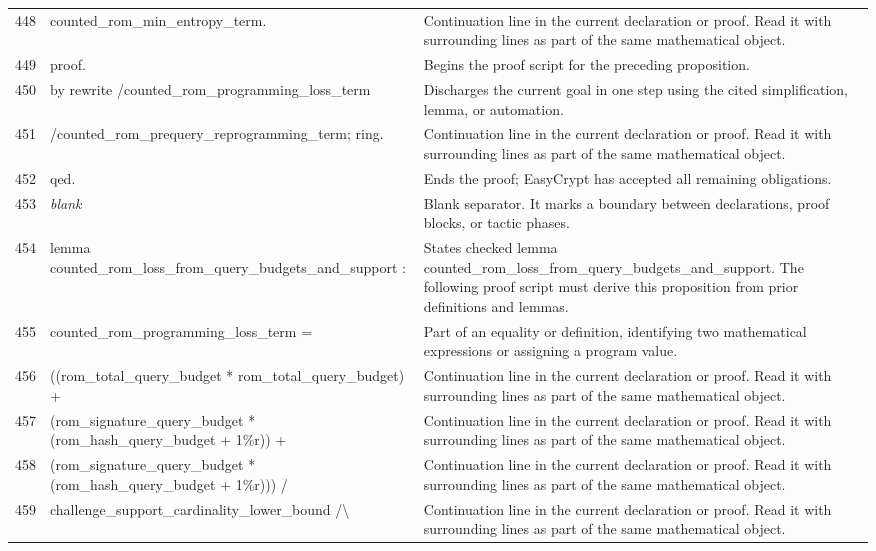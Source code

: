 \documentclass[10pt]{article}
\begin{document}
\begin{longtable}{r L{0.53\textwidth} L{0.37\textwidth}}
448 & {\ttfamily\scriptsize     counted\_rom\_min\_entropy\_term.} & Continuation line in the current declaration or proof.  Read it with surrounding lines as part of the same mathematical object. \\
449 & {\ttfamily\scriptsize proof.} & Begins the proof script for the preceding proposition. \\
450 & {\ttfamily\scriptsize by rewrite /counted\_rom\_programming\_loss\_term} & Discharges the current goal in one step using the cited simplification, lemma, or automation. \\
451 & {\ttfamily\scriptsize            /counted\_rom\_prequery\_reprogramming\_term; ring.} & Continuation line in the current declaration or proof.  Read it with surrounding lines as part of the same mathematical object. \\
452 & {\ttfamily\scriptsize qed.} & Ends the proof; EasyCrypt has accepted all remaining obligations. \\
453 & {\ttfamily\scriptsize \emph{blank}} & Blank separator.  It marks a boundary between declarations, proof blocks, or tactic phases. \\
454 & {\ttfamily\scriptsize lemma counted\_rom\_loss\_from\_query\_budgets\_and\_support :} & States checked lemma counted\_rom\_loss\_from\_query\_budgets\_and\_support.  The following proof script must derive this proposition from prior definitions and lemmas. \\
455 & {\ttfamily\scriptsize   counted\_rom\_programming\_loss\_term =} & Part of an equality or definition, identifying two mathematical expressions or assigning a program value. \\
456 & {\ttfamily\scriptsize     ((rom\_total\_query\_budget * rom\_total\_query\_budget) +} & Continuation line in the current declaration or proof.  Read it with surrounding lines as part of the same mathematical object. \\
457 & {\ttfamily\scriptsize      (rom\_signature\_query\_budget * (rom\_hash\_query\_budget + 1\%r)) +} & Continuation line in the current declaration or proof.  Read it with surrounding lines as part of the same mathematical object. \\
458 & {\ttfamily\scriptsize      (rom\_signature\_query\_budget * (rom\_hash\_query\_budget + 1\%r))) /} & Continuation line in the current declaration or proof.  Read it with surrounding lines as part of the same mathematical object. \\
459 & {\ttfamily\scriptsize     challenge\_support\_cardinality\_lower\_bound /\textbackslash{}} & Continuation line in the current declaration or proof.  Read it with surrounding lines as part of the same mathematical object. \\

\end{longtable}
\end{document}
